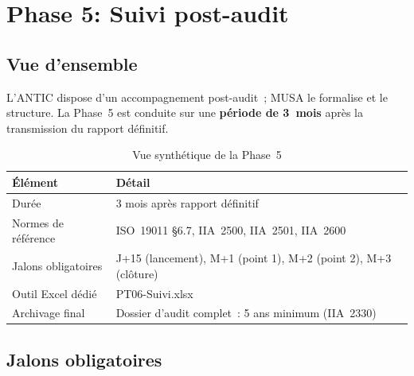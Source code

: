\documentclass[12pt,a4paper,oneside]{report}
\begin{document}
\section{Phase 5: Suivi post-audit}
\label{sec:phase5}

\subsection{Vue d'ensemble}

L'ANTIC dispose d'un accompagnement post-audit~; MUSA le formalise et le
structure. La Phase~5 est conduite sur une \textbf{p\'eriode de 3~mois}
apr\`es la transmission du rapport d\'efinitif.

\begin{table}[H]
	\centering\small
	\caption{Vue synth\'etique de la Phase~5}
	\label{tab:vue_p5}
	\begin{tabularx}{\textwidth}{p{3.5cm}X}
		\toprule
		\rowcolor{theadcolor}
		\color{white}\textbf{\'El\'ement} &
		\color{white}\textbf{D\'etail} \\
		\midrule
		Dur\'ee & 3 mois apr\`es rapport d\'efinitif \\
		Normes de r\'ef\'erence & ISO~19011 §6.7, IIA~2500, IIA~2501, IIA~2600 \\
		Jalons obligatoires & J+15 (lancement), M+1 (point 1), M+2 (point 2), M+3 (cl\^oture) \\
		Outil Excel d\'edi\'e & PT06-Suivi.xlsx \\
		Archivage final & Dossier d'audit complet~: 5 ans minimum (IIA~2330) \\
		\bottomrule
	\end{tabularx}
\end{table}

\subsection{Jalons obligatoires}
\end{document}
